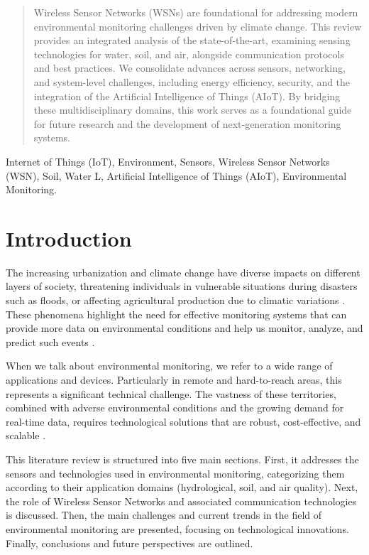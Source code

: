 \documentclass[conference]{IEEEtran}
\begin{document}
\begin{abstract}
Wireless Sensor Networks (WSNs) are foundational for addressing modern environmental monitoring challenges driven by climate change. This review provides an integrated analysis of the state-of-the-art, examining sensing technologies for water, soil, and air, alongside communication protocols and best practices. We consolidate advances across sensors, networking, and system-level challenges, including energy efficiency, security, and the integration of the Artificial Intelligence of Things (AIoT). By bridging these multidisciplinary domains, this work serves as a foundational guide for future research and the development of next-generation monitoring systems.
\end{abstract}

\begin{IEEEkeywords}
Internet of Things (IoT), Environment, Sensors, Wireless Sensor Networks (WSN), Soil, Water L, Artificial Intelligence of Things (AIoT), Environmental Monitoring.
\end{IEEEkeywords}

\section{Introduction}
The increasing urbanization and climate change have diverse impacts on different layers of society, threatening individuals in vulnerable situations during disasters such as floods, or affecting agricultural production due to climatic variations \cite{jonkman_2005_global, hall_2014_understanding, bragana_2024_anlise, borga_2014_hydrogeomorphic}. These phenomena highlight the need for effective monitoring systems that can provide more data on environmental conditions and help us monitor, analyze, and predict such events \cite{hall_2014_understanding, lin_2020_semantic, lo_2015_visual, iqbal_2021_how}.

When we talk about environmental monitoring, we refer to a wide range of applications and devices. Particularly in remote and hard-to-reach areas, this represents a significant technical challenge. The vastness of these territories, combined with adverse environmental conditions and the growing demand for real-time data, requires technological solutions that are robust, cost-effective, and scalable \cite{chen_2013_natural, yellampalli_2021_wireless, pule_2017_wireless}.

This literature review is structured into five main sections. First, it addresses the sensors and technologies used in environmental monitoring, categorizing them according to their application domains (hydrological, soil, and air quality). Next, the role of Wireless Sensor Networks and associated communication technologies is discussed. Then, the main challenges and current trends in the field of environmental monitoring are presented, focusing on technological innovations. Finally, conclusions and future perspectives are outlined.
\end{document}
